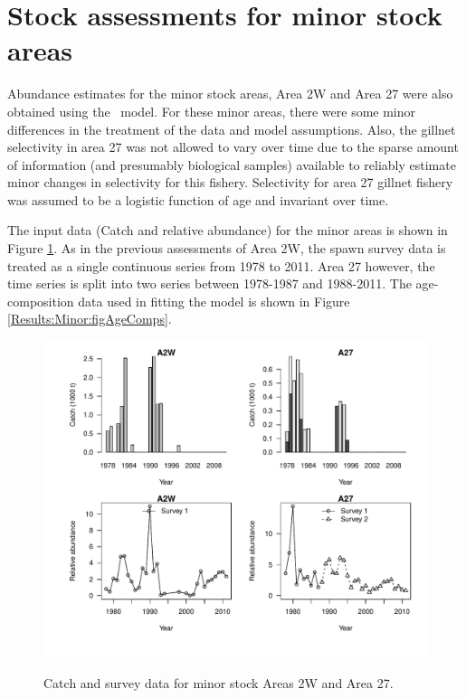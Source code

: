 
\section{Stock assessments for minor stock areas}

Abundance estimates for the minor stock areas, Area 2W and Area 27 were also obtained using the \iscam\ model.  For these minor areas, there were some minor differences in the treatment of the data and model assumptions.  Also, the gillnet selectivity in area 27 was not allowed to vary over time due to the sparse amount of information (and presumably biological samples) available to reliably estimate minor changes in selectivity for this fishery. Selectivity for area 27 gillnet fishery was assumed to be a logistic function of age and invariant over time.

The input data (Catch and relative abundance) for the minor areas is shown in Figure \ref{Results:Minor:figData}.  As in the previous assessments of Area 2W, the spawn survey data is treated as a single continuous series from 1978 to 2011.  Area 27 however, the time series is split into two series between 1978-1987 and 1988-2011.  The age-composition data used in fitting the model is shown in Figure \ref{Results:Minor:figAgeComps}.




\begin{figure}[!tbp]
	\includegraphics[width=\textwidth]{../FIGS/MinorAreas/iscam_fig_MinorAreaData.pdf}\\
	\caption{Catch and survey data for minor stock Areas 2W and Area 27.}\label{Results:Minor:figData}
\end{figure}

